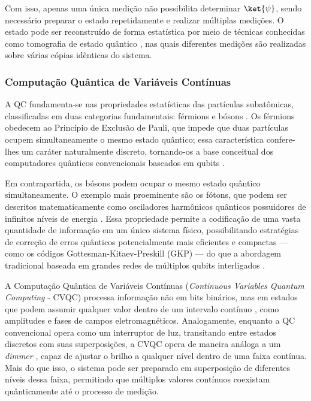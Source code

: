 Com isso, apenas uma única medição não possibilita determinar $\ket{\psi}$, sendo necessário preparar o estado repetidamente e realizar múltiplas medições. O estado pode ser reconstruído de forma estatística por meio de técnicas conhecidas como tomografia de estado quântico \cite{james2001measurement}, nas quais diferentes medições são realizadas sobre várias cópias idênticas do sistema.

\subsubsection{Computação Quântica de Variáveis Contínuas}\label{subsubsec:cvqc}

A QC fundamenta-se nas propriedades estatísticas das partículas 
subatômicas, classificadas em duas categorias fundamentais: férmions e bósons \cite{cohen2019quantum}. Os férmions obedecem ao Princípio de Exclusão de Pauli, que impede que duas partículas ocupem simultaneamente o mesmo estado quântico;  essa característica confere-lhes um caráter naturalmente discreto, tornando-os  a base conceitual dos computadores quânticos convencionais baseados em qubits \cite{sakurai2020modern}.

Em contrapartida, os bósons podem ocupar o mesmo estado quântico simultaneamente.  O exemplo mais proeminente são os fótons, que podem ser descritos matematicamente  como osciladores harmônicos quânticos possuidores de infinitos níveis de energia  \cite{braunstein2005quantum}. Essa propriedade permite a codificação de uma vasta quantidade de informação em um único sistema físico, possibilitando estratégias de correção de erros quânticos potencialmente mais eficientes e compactas — como os códigos Gottesman-Kitaev-Preskill (GKP) — do que a abordagem tradicional baseada em grandes redes de múltiplos qubits interligados \cite{gottesman2000encoding, weedbrook2012gaussian}.

A Computação Quântica de Variáveis Contínuas (\textit{Continuous Variables Quantum Computing} - CVQC) processa informação não em bits binários, mas em estados que podem assumir qualquer valor dentro de um intervalo contínuo \cite{braunstein2005quantum}, como amplitudes e fases de campos eletromagnéticos. Analogamente, enquanto a QC convencional opera como um interruptor de luz, transitando entre estados discretos com suas superposições, a CVQC opera de maneira análoga a um \textit{dimmer} \cite{lloyd1999quantum}, capaz de ajustar o brilho a qualquer nível dentro de uma faixa contínua. Mais do que isso, o sistema pode ser preparado em superposição de diferentes níveis dessa faixa, permitindo que múltiplos valores contínuos coexistam quânticamente até o processo de medição.

